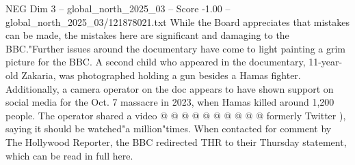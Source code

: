 \begin{textsample}{NEG Dim 3 – global\_north\_2025\_03 – Score -1.00 – global\_north\_2025\_03/121878021.txt}
While the Board appreciates that mistakes can be made, the mistakes here are significant and damaging to the BBC."Further issues around the documentary have come to light painting a grim picture for the BBC.
A second child who appeared in the documentary, 11-year-old Zakaria, was photographed holding a gun besides a Hamas fighter.
Additionally, a camera operator on the doc appears to have shown support on social media for the Oct. 7 massacre in 2023, when Hamas killed around 1,200 people.
The operator shared a video @ @ @ @ @ @ @ @ @ @ formerly Twitter ), saying it should be watched"a million"times.
When contacted for comment by The Hollywood Reporter, the BBC redirected THR to their Thursday statement, which can be read in full here.

\end{textsample}
